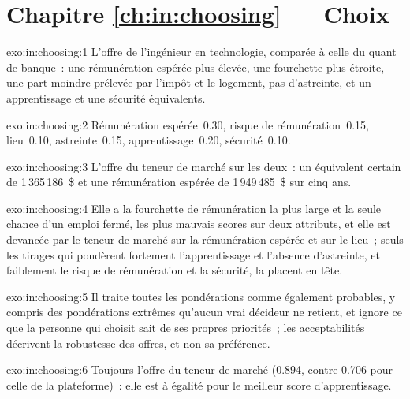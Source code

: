 \section*{Chapitre \ref{ch:in:choosing} --- Choix}

\begin{solution}{exo:in:choosing:1}
L'offre de l'ingénieur en technologie, comparée à celle du quant de banque~: une rémunération espérée plus élevée, une fourchette plus étroite, une part moindre prélevée
par l'impôt et le logement, pas d'astreinte, et un apprentissage et une sécurité équivalents.
\end{solution}

\begin{solution}{exo:in:choosing:2}
Rémunération espérée~0.30, risque de rémunération~0.15, lieu~0.10, astreinte~0.15, apprentissage~0.20, sécurité~0.10.
\end{solution}

\begin{solution}{exo:in:choosing:3}
L'offre du teneur de marché sur les deux~: un équivalent certain de 1\,365\,186~\$ et une rémunération espérée de 1\,949\,485~\$ sur
cinq ans.
\end{solution}

\begin{solution}{exo:in:choosing:4}
Elle a la fourchette de rémunération la plus large et la seule chance d'un emploi fermé, les plus mauvais scores sur deux attributs, et elle est devancée
par le teneur de marché sur la rémunération espérée et sur le lieu~; seuls les tirages qui pondèrent fortement l'apprentissage et l'absence d'astreinte, et
faiblement le risque de rémunération et la sécurité, la placent en tête.
\end{solution}

\begin{solution}{exo:in:choosing:5}
Il traite toutes les pondérations comme également probables, y compris des pondérations extrêmes qu'aucun vrai décideur ne retient, et
ignore ce que la personne qui choisit sait de ses propres priorités~; les acceptabilités décrivent la robustesse des offres, et non sa préférence.
\end{solution}

\begin{solution}{exo:in:choosing:6}
Toujours l'offre du teneur de marché (0.894, contre 0.706 pour celle de la plateforme)~: elle est à égalité pour le meilleur score d'apprentissage.
\end{solution}

